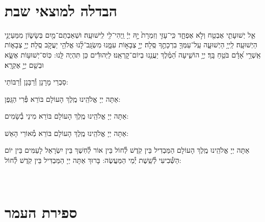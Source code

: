 \documentclass[twoside, openany, parskip=half, 11pt]{book}
\begin{document}
\vfill


 \\


\section[הבדלה]{ הבדלה למוצאי שבת } \label{havdala}

אֵ֧ל יְשׁוּעָתִ֛י אֶבְטַ֖ח וְלֹ֣א אֶפְחָ֑ד כִּֽי־עָזִּ֤י וְזִמְרָת֙ יָ֣הּ יְיָ֔ וַֽיְהִי־לִ֖י לִֽישׁוּעָֽה׃
וּשְׁאַבְתֶּם־מַ֖יִם בְּשָׂשׂ֑וֹן מִמַּעַיְנֵ֖י הַיְשׁוּעָֽה׃
לַֽייָ֥ הַיְשׁוּעָ֑ה עַֽל־עַמְּךָ֖ בִרְכָתֶ֣ךָ סֶּֽלָה׃
יְיָ֣ צְבָא֣וֹת עִמָּ֑נוּ מִשְׂגָּֽב־לָ֨נוּ אֱלֹהֵ֖י יַעֲקֹ֣ב סֶֽלָה׃
יְיָ֥ צְבָא֑וֹת אַֽשְׁרֵ֥י אָ֝דָ֗ם בֹּטֵ֥חַ בָּֽךְ׃
יְיָ֥ הוֹשִׁ֑יעָה הַ֝מֶּ֗לֶךְ יַעֲנֵ֥נוּ בְיוֹם־קׇרְאֵֽנוּ׃
לַיְּהוּדִ֕ים  כֵּן תִּהְיֶה לָּֽנוּ: כּֽוֹס־יְשׁוּע֥וֹת אֶשָּׂ֑א וּבְשֵׁ֖ם יְיָ֣ אֶקְרָֽא׃

\begin{scriptsize}
סַבְרֵי מָרָנָן וְ֯רַבָּנָן וְ֯רַבּוֹתַי: \\
\end{scriptsize}
אַתָּה יְיָ אֱלֹהֵֽינוּ מֶֽלֶךְ הָעוֹלָם בּוֹרֵא פְּ֯רִי הַגָּֽפֶן:

אַתָּה יְיָ אֱלֹהֵֽינוּ מֶֽלֶךְ הָעוֹלָם בּוֹרֵא מִינֵי בְ֯שָׂמִים:

אַתָּה יְיָ אֱלֹהֵֽינוּ מֶֽלֶךְ הָעוֹלָם בּוֹרֵא מְ֯אוֹרֵי הָאֵשׁ:

אַתָּה יְיָ אֱלֹהֵֽינוּ מֶֽלֶךְ הָעוֹלָם הַמַּבְדִיל בֵּין קֹֽדֶשׁ לְ֯חוֹל בֵּין אוֹר לְ֯חֽשֶׁךְ בֵּין יִשְׂרָאֵל לָעַמִּים בֵּין יוֹם הַשְּׁ֯בִיעִי לְ֯שֵֽׁשֶׁת יְ֯מֵי הַמַּעֲשֶׂה: בָּרוּךְ אַתָּה יְיָ הַמַּבְדִּיל בֵּין קֹֽדֶשׁ לְ֯חוֹל:
\clearpage

\vspace{-1.3\baselineskip}










\quad{}\quad{}\\

\section{ספירת העמר}
\label{sefiras haomer}
\end{document}
